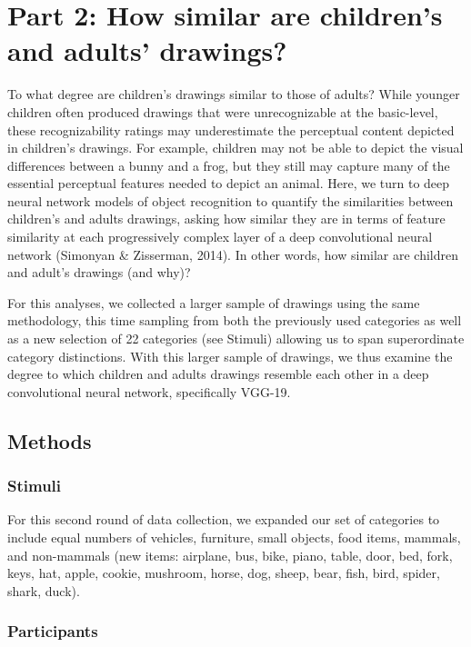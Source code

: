 \documentclass[10pt, letterpaper]{article}
\begin{document}
\section{Part 2: How similar are children's and adults'
drawings?}\label{part-2-how-similar-are-childrens-and-adults-drawings}

To what degree are children's drawings similar to those of adults? While
younger children often produced drawings that were unrecognizable at the
basic-level, these recognizability ratings may underestimate the
perceptual content depicted in children's drawings. For example,
children may not be able to depict the visual differences between a
bunny and a frog, but they still may capture many of the essential
perceptual features needed to depict an animal. Here, we turn to deep
neural network models of object recognition to quantify the similarities
between children's and adults drawings, asking how similar they are in
terms of feature similarity at each progressively complex layer of a
deep convolutional neural network (Simonyan \& Zisserman, 2014). In
other words, how similar are children and adult's drawings (and why)?

For this analyses, we collected a larger sample of drawings using the
same methodology, this time sampling from both the previously used
categories as well as a new selection of 22 categories (see Stimuli)
allowing us to span superordinate category distinctions. With this
larger sample of drawings, we thus examine the degree to which children
and adults drawings resemble each other in a deep convolutional neural
network, specifically VGG-19.

\subsection{Methods}\label{methods-1}

\subsubsection{Stimuli}\label{stimuli-1}

For this second round of data collection, we expanded our set of
categories to include equal numbers of vehicles, furniture, small
objects, food items, mammals, and non-mammals (new items: airplane, bus,
bike, piano, table, door, bed, fork, keys, hat, apple, cookie, mushroom,
horse, dog, sheep, bear, fish, bird, spider, shark, duck).

\subsubsection{Participants}\label{participants-1}
\end{document}
